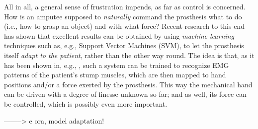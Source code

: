 All in all, a general sense of frustration impends, as far as control
is concerned. How is an amputee supposed to \emph{naturally} command
the prosthesis what to do (i.e., how to grasp an object) and with what
force? Recent research to this end has shown that excellent results
can be obtained by using \emph{machine learning} techniques such as,
e.g., Support Vector Machines (SVM), to let the prosthesis itself
\emph{adapt to the patient}, rather than the other way round. The idea
is that, as it has been shown in, e.g.,
\cite{smagt,dunlop,2008.ICRA,2008.BioCyb,Sebelius2005}, such a system
can be trained to recognize EMG patterns of the patient's stump
muscles, which are then mapped to hand positions and/or a force
exerted by the prosthesis. This way the mechanical hand can be driven
with a degree of finesse unknown so far; and as well, its force can be
controlled, which is possibly even more important.

--------> e ora, model adaptation!
